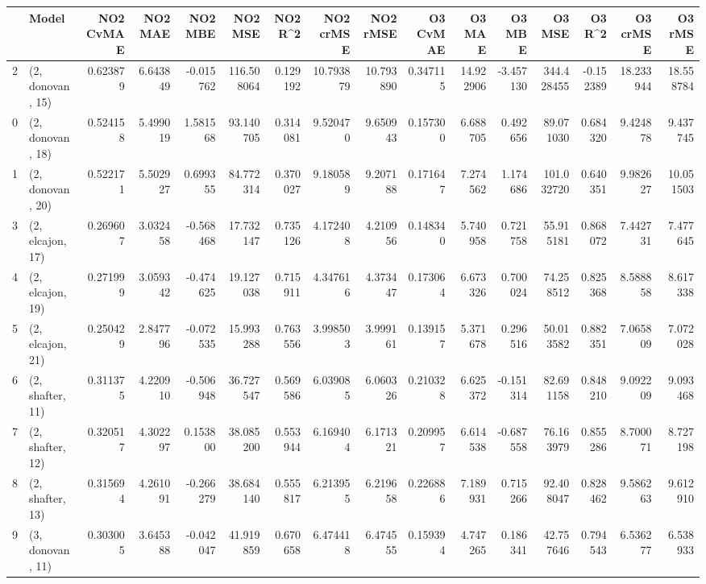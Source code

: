 \begin{tabular}{llrrrrrrrrrrrrrr}
\toprule
{} &             Model &  NO2 CvMAE &   NO2 MAE &   NO2 MBE &     NO2 MSE &   NO2 R\textasciicircum2 &  NO2 crMSE &   NO2 rMSE &  O3 CvMAE &     O3 MAE &    O3 MBE &      O3 MSE &    O3 R\textasciicircum2 &   O3 crMSE &    O3 rMSE \\
\midrule
2  &  (2, donovan, 15) &   0.623879 &  6.643849 & -0.015762 &  116.508064 &  0.129192 &  10.793879 &  10.793890 &  0.347115 &  14.922906 & -3.457130 &  344.428455 & -0.152389 &  18.233944 &  18.558784 \\
0  &  (2, donovan, 18) &   0.524158 &  5.499019 &  1.581568 &   93.140705 &  0.314081 &   9.520470 &   9.650943 &  0.157300 &   6.688705 &  0.492656 &   89.071030 &  0.684320 &   9.424878 &   9.437745 \\
1  &  (2, donovan, 20) &   0.522171 &  5.502927 &  0.699355 &   84.772314 &  0.370027 &   9.180589 &   9.207188 &  0.171647 &   7.274562 &  1.174686 &  101.032720 &  0.640351 &   9.982627 &  10.051503 \\
3  &  (2, elcajon, 17) &   0.269607 &  3.032458 & -0.568468 &   17.732147 &  0.735126 &   4.172408 &   4.210956 &  0.148340 &   5.740958 &  0.721758 &   55.915181 &  0.868072 &   7.442731 &   7.477645 \\
4  &  (2, elcajon, 19) &   0.271999 &  3.059342 & -0.474625 &   19.127038 &  0.715911 &   4.347616 &   4.373447 &  0.173064 &   6.673326 &  0.700024 &   74.258512 &  0.825368 &   8.588858 &   8.617338 \\
5  &  (2, elcajon, 21) &   0.250429 &  2.847796 & -0.072535 &   15.993288 &  0.763556 &   3.998503 &   3.999161 &  0.139157 &   5.371678 &  0.296516 &   50.013582 &  0.882351 &   7.065809 &   7.072028 \\
6  &  (2, shafter, 11) &   0.311375 &  4.220910 & -0.506948 &   36.727547 &  0.569586 &   6.039085 &   6.060326 &  0.210328 &   6.625372 & -0.151314 &   82.691158 &  0.848210 &   9.092209 &   9.093468 \\
7  &  (2, shafter, 12) &   0.320517 &  4.302297 &  0.153800 &   38.085200 &  0.553944 &   6.169404 &   6.171321 &  0.209957 &   6.614538 & -0.687558 &   76.163979 &  0.855286 &   8.700071 &   8.727198 \\
8  &  (2, shafter, 13) &   0.315694 &  4.261091 & -0.266279 &   38.684140 &  0.555817 &   6.213955 &   6.219658 &  0.226886 &   7.189931 &  0.715266 &   92.408047 &  0.828462 &   9.586263 &   9.612910 \\
9  &  (3, donovan, 11) &   0.303005 &  3.645388 & -0.042047 &   41.919859 &  0.670658 &   6.474418 &   6.474555 &  0.159394 &   4.747265 &  0.186341 &   42.757646 &  0.794543 &   6.536277 &   6.538933 \\

\end{tabular}
